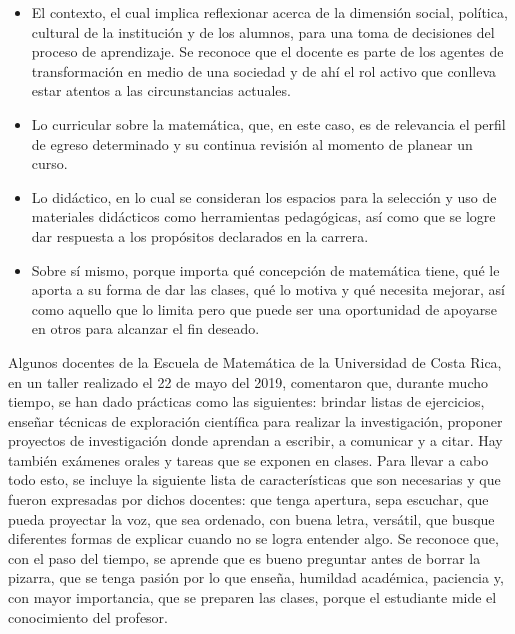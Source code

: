 \begin{itemize}
    
    \color{blue} \item \color{black} El contexto, el cual implica reflexionar acerca de la dimensión social, política, cultural de la institución y de los alumnos, para una toma de decisiones del proceso de aprendizaje. Se reconoce que el docente es parte de los agentes de transformación en medio de una sociedad y de ahí el rol activo que conlleva estar atentos a las circunstancias actuales. 

     \color{blue} \item \color{black} Lo curricular sobre la matemática, que, en este caso, es de relevancia el perfil de egreso determinado y su continua revisión al momento de planear un curso. 
     
    \color{blue} \item \color{black} Lo didáctico, en lo cual se consideran los espacios para la selección y uso de materiales didácticos como herramientas pedagógicas, así como que se logre dar respuesta a los propósitos declarados en la carrera. 
    
    \color{blue} \item \color{black} Sobre sí mismo, porque importa qué concepción de matemática tiene, qué le aporta a su forma de dar las clases, qué lo motiva y qué necesita mejorar, así como aquello que lo limita pero que puede ser una oportunidad de apoyarse en otros para alcanzar el fin deseado.
    \end{itemize}
    
Algunos docentes de la Escuela de Matemática de la Universidad de Costa Rica, en un taller realizado el 22 de mayo del 2019, comentaron que, durante mucho tiempo, se han dado prácticas como las siguientes: brindar listas de ejercicios, enseñar técnicas de exploración científica para realizar la investigación, proponer proyectos de investigación donde aprendan a escribir, a comunicar y a citar. Hay también exámenes orales y tareas que se exponen en clases. Para llevar a cabo todo esto, se incluye la siguiente lista de características que son necesarias y que fueron expresadas por dichos docentes: que tenga apertura, sepa escuchar, que pueda proyectar la voz, que sea ordenado, con buena letra, versátil, que busque diferentes formas de explicar cuando no se logra entender algo. Se reconoce que, con el paso del tiempo, se aprende que es bueno preguntar antes de borrar la pizarra, que se tenga pasión por lo que enseña, humildad académica, paciencia y, con mayor importancia, que se preparen las clases, porque el estudiante mide el conocimiento del profesor. 

